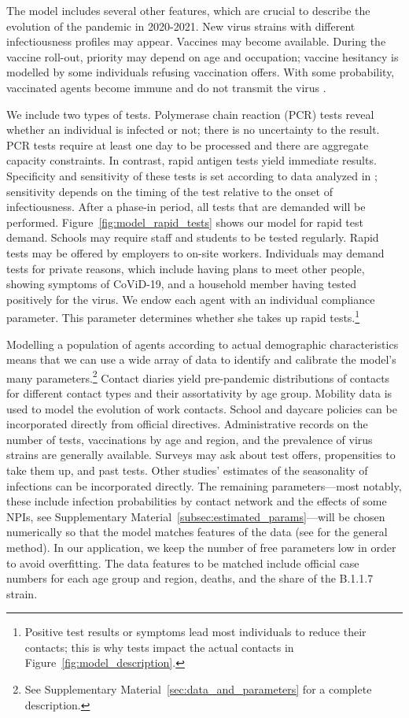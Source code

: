 \documentclass[12pt]{article}
\begin{document}
The model includes several other features, which are crucial to describe the evolution of
the pandemic in 2020-2021. New virus strains with different infectiousness profiles may
appear. Vaccines may become available. During the vaccine roll-out, priority may depend
on age and occupation; vaccine hesitancy is modelled by some individuals refusing
vaccination offers. With some probability, vaccinated agents become immune and do not
transmit the virus \cite{Hunter2021, LevineTiefenbrun2021, Petter2021,
Pritchard2021}.

We include two types of tests. Polymerase chain reaction (PCR) tests reveal whether an
individual is infected or not; there is no uncertainty to the result. PCR tests require
at least one day to be processed and there are aggregate capacity constraints. In
contrast, rapid antigen tests
yield immediate results. Specificity and
sensitivity of these tests is set
according to data analyzed in \cite{Bruemmer2021, Smith2021}; sensitivity depends on the
timing of the test relative to the onset of infectiousness. After a phase-in period, all
tests that are demanded will be performed. Figure~\ref{fig:model_rapid_tests} shows our
model for rapid test demand. Schools may require staff and students to be tested
regularly. Rapid tests may be offered by
employers to on-site workers. Individuals may demand tests for private reasons, which
include having plans to meet other people, showing symptoms of CoViD-19, and a household
member having tested positively for the virus. We endow each agent with an individual
compliance parameter. This parameter determines whether she takes up rapid
tests.\footnote{Positive test results or symptoms lead most individuals to reduce their
    contacts; this is why tests impact the actual contacts in
    Figure~\ref{fig:model_description}.}

Modelling a population of agents according to actual demographic characteristics means
that we can use a wide array of data to identify and calibrate the model's many
parameters.\footnote{See Supplementary Material~\ref{sec:data_and_parameters} for a
    complete description.} Contact diaries yield pre-pandemic distributions of contacts for
different contact types and their assortativity by age group. Mobility data is used to
model the evolution of work contacts. School and daycare policies can be incorporated
directly from official directives. Administrative records on the number of tests,
vaccinations by age and region, and the prevalence of virus strains are generally
available. Surveys may ask about test offers, propensities to take them up, and past
tests. Other studies' estimates of the seasonality of infections can be incorporated
directly. The remaining parameters---most notably, these include infection probabilities
by contact network and the effects of some NPIs, see Supplementary
Material~\ref{subsec:estimated_params}---will be chosen numerically so that the model
matches features of the data (see \cite{McFadden1989} for the general method). In our
application, we keep the number of free parameters low in order to avoid overfitting.
The data features to be matched include official case numbers for each age group and
region, deaths, and the share of the B.1.1.7 strain.
\end{document}
